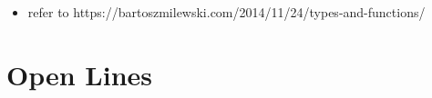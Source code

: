 \documentclass{beamer}
\begin{document}
\begin{frame}
  \begin{itemize}
  \item refer to https://bartoszmilewski.com/2014/11/24/types-and-functions/
  \end{itemize}


  
  
  
  
  
  
  
  
  
  
  
  
  
  



\end{frame}

\section{Open Lines}
\end{document}
